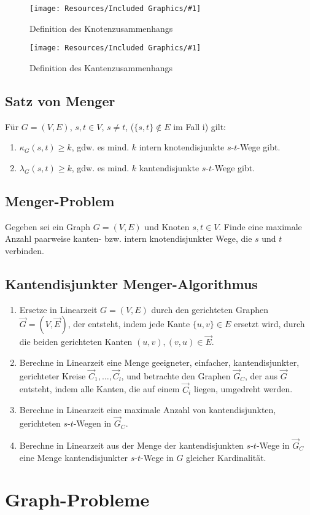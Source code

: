 \documentclass[a4paper,11pt]{report}
\newcommand{\fig}[2]{
    \begin{figure}[h]
        \begin{center}
            \texttt{[image: Resources/Included Graphics/\#1]}
            \caption{#1}
            \label{fig:#1}
        \end{center}
    \end{figure}
}
\begin{document}
\fig{Definition des Knotenzusammenhangs}{.6}
\fig{Definition des Kantenzusammenhangs}{.5}


\section{Satz von Menger}
Für $G = (V, E)$, $s, t \in V$, $s \neq t$, ($\{s, t\} \not \in E$ im Fall i) gilt:

\begin{enumerate}
    \item $\kappa_G(s, t) \geq k$, gdw. es mind. $k$ intern knotendisjunkte $s$-$t$-Wege gibt.
    \item $\lambda_G(s, t) \geq k$, gdw. es mind. $k$ kantendisjunkte $s$-$t$-Wege gibt.
\end{enumerate}

\section{Menger-Problem}
Gegeben sei ein Graph $G = (V, E)$ und Knoten $s, t \in V$. Finde eine maximale Anzahl paarweise kanten- bzw. intern knotendisjunkter Wege, die $s$ und $t$ verbinden.


\section{Kantendisjunkter Menger-Algorithmus}
\begin{enumerate}
    \item Ersetze in Linearzeit $G = (V, E)$ durch den gerichteten Graphen $\vec G = (V, \vec E)$, der entsteht, indem jede Kante $\{u, v\} \in E$ ersetzt wird, durch die beiden gerichteten Kanten $(u, v), (v, u) \in \vec E$.
    \item Berechne in Linearzeit eine Menge geeigneter, einfacher, kantendisjunkter, gerichteter Kreise $\vec C_1, \ldots, \vec C_l$, und betrachte den Graphen $\vec G_C$, der aus $\vec G$ entsteht, indem alle Kanten, die auf einem $\vec C_i$ liegen, umgedreht werden.
    \item Berechne in Linearzeit eine maximale Anzahl von kantendisjunkten, gerichteten $s$-$t$-Wegen in $\vec G_C$.
    \item Berechne in Linearzeit aus der Menge der kantendisjunkten $s$-$t$-Wege in $\vec G_C$ eine Menge kantendisjunkter $s$-$t$-Wege in $G$ gleicher Kardinalität.
\end{enumerate}


\chapter{Graph-Probleme}
\end{document}
